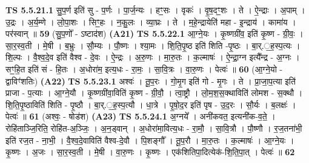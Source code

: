 \documentclass[17pt]{extarticle}
\begin{document}
                                \textbf{ TS 5.5.21.1} \newline
                  सु॒प॒र्ण इति॑ सु - प॒र्णः । पा॒र्ज॒न्यः । हꣳ॒॒सः । वृकः॑ । वृ॒ष॒दꣳ॒॒शः । ते । ऐ॒न्द्राः । अ॒पाम् । उ॒द्रः । अ॒र्य॒म्णे । लो॒पा॒शः । सिꣳ॒॒हः । न॒कु॒लः । व्या॒घ्रः । ते । म॒हे॒न्द्रायेति॑ महा - इ॒न्द्राय॑ । कामा॑य । पर॑स्वान् ॥ \textbf{  59} \newline
                  \newline
                      (सु॒प॒णो᳚ - ऽष्टाद॑श)  \textbf{(A21)} \newline \newline
                                \textbf{ TS 5.5.22.1} \newline
                  आ॒ग्ने॒यः । कृ॒ष्णग्री॑व॒ इति॑ कृ॒ष्ण - ग्री॒वः॒ । सा॒र॒स्व॒ती । मे॒षी । ब॒भ्रुः । सौ॒म्यः । पौ॒ष्णः । श्या॒मः । शि॒ति॒पृ॒ष्ठ इति॑ शिति -पृ॒ष्ठः । बा॒र्.॒ह॒स्प॒त्यः । शि॒ल्पः । वै॒श्व॒दे॒व इति॑ वैश्व - दे॒वः । ऐ॒न्द्रः । अ॒रु॒णः । मा॒रु॒तः । क॒ल्माषः॑ । ऐ॒न्द्रा॒ग्न इत्यै᳚न्द्र - अ॒ग्नः । सꣳ॒॒हि॒त इति॑ सं - हि॒तः । अ॒धोरा॑म॒ इत्य॒धः - रा॒मः॒ । सा॒वि॒त्रः । वा॒रु॒णः । पेत्वः॑ ॥ \textbf{  60} \newline
                  \newline
                      (आ॒ग्ने॒यो - द्वाविꣳ॑शतिः)  \textbf{(A22)} \newline \newline
                                \textbf{ TS 5.5.23.1} \newline
                  अश्वः॑ । तू॒प॒रः । गो॒मृ॒ग इति॑ गो - मृ॒गः । ते । प्रा॒जा॒प॒त्या इति॑ प्राजा - प॒त्याः । आ॒ग्ने॒यौ । कृ॒ष्णग्री॑वा॒विति॑ कृ॒ष्ण - ग्री॒वौ॒ । त्वा॒ष्ट्रौ । लो॒म॒श॒स॒क्थाविति॑ लोमश - स॒क्थौ । शि॒ति॒पृ॒ष्ठाविति॑ शिति - पृ॒ष्ठौ । बा॒र्.॒ह॒स्प॒त्यौ । धा॒त्रे । पृ॒षो॒द॒र इति॑ पृष - उ॒द॒रः । सौ॒र्यः । ब॒लक्षः॑ । पेत्वः॑ ॥ \textbf{  61 } \newline
                  \newline
                      (अश्वः॒ - षोड॑श)  \textbf{(A23)} \newline \newline
                                \textbf{ TS 5.5.24.1} \newline
                  अ॒ग्नये᳚ । अनी॑कवत॒ इत्यनी॑क-व॒ते॒ । रोहि॑ताञ्जि॒रिति॒ रोहि॑त-अ॒ञ्जिः॒ । अ॒न॒ड्वान् । अ॒धोरा॑मा॒वित्य॒धः - रा॒मौ॒ । सा॒वि॒त्रौ । पौ॒ष्णौ । र॒ज॒तना॑भी॒ इति॑ रज॒त - ना॒भी॒ । वै॒श्व॒दे॒वाविति॑ वैश्व-दे॒वौ । पि॒शङ्गौ᳚ । तू॒प॒रौ । मा॒रु॒तः । क॒ल्माषः॑ । आ॒ग्ने॒यः । कृ॒ष्णः । अ॒जः । सा॒र॒स्व॒ती । मे॒षी । वा॒रु॒णः । कृ॒ष्णः । एक॑शितिपा॒दित्येक॑-शि॒ति॒पा॒त् । पेत्वः॑ ॥ \textbf{  62} \newline
\end{document}
